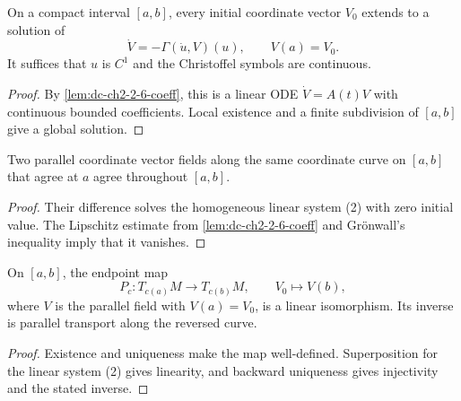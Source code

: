 \begin{lemma}
  \label{lem:dc-ch2-2-6-exist}
  \leanok
  On a compact interval $[a,b]$, every initial coordinate vector $V_0$ extends
  to a solution of
  \[
    \dot V=-\Gamma(\dot u,V)(u),\qquad V(a)=V_0.
  \]
  It suffices that $u$ is $C^1$ and the Christoffel symbols are continuous.
\end{lemma}
\begin{proof}
  \sketch
  By \cref{lem:dc-ch2-2-6-coeff}, this is a linear ODE
  $\dot V=A(t)V$ with continuous bounded coefficients. Local existence and a
  finite subdivision of $[a,b]$ give a global solution.
\end{proof}

\begin{lemma}
  \label{lem:dc-ch2-2-6-unique}
  \leanok
  Two parallel coordinate vector fields along the same coordinate curve on
  $[a,b]$ that agree at $a$ agree throughout $[a,b]$.
\end{lemma}
\begin{proof}
  \sketch
  Their difference solves the homogeneous linear system (2) with zero initial
  value. The Lipschitz estimate from \cref{lem:dc-ch2-2-6-coeff} and
  Grönwall's inequality imply that it vanishes.
\end{proof}

\begin{lemma}
  \label{lem:dc-ch2-2-6-transport}
  \leanok
  On $[a,b]$, the endpoint map
  \[
    P_c\colon T_{c(a)}M\longrightarrow T_{c(b)}M,
    \qquad V_0\longmapsto V(b),
  \]
  where $V$ is the parallel field with $V(a)=V_0$, is a linear isomorphism.
  Its inverse is parallel transport along the reversed curve.
\end{lemma}
\begin{proof}
  \sketch
  Existence and uniqueness make the map well-defined. Superposition for the
  linear system (2) gives linearity, and backward uniqueness gives injectivity
  and the stated inverse.
\end{proof}

